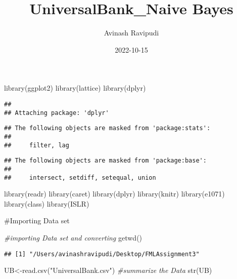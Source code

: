 \documentclass[
]{article}
\title{UniversalBank\_Naive Bayes}
\author{Avinash Ravipudi}
\date{2022-10-15}
\newenvironment{Shaded}{\begin{snugshade}}{\end{snugshade}}
\newcommand{\CommentTok}[1]{\textcolor[rgb]{0.56,0.35,0.01}{\textit{#1}}}
\newcommand{\FunctionTok}[1]{\textcolor[rgb]{0.00,0.00,0.00}{#1}}
\newcommand{\NormalTok}[1]{#1}
\newcommand{\OtherTok}[1]{\textcolor[rgb]{0.56,0.35,0.01}{#1}}
\newcommand{\StringTok}[1]{\textcolor[rgb]{0.31,0.60,0.02}{#1}}
\begin{document}
\maketitle

\begin{Shaded}
\begin{Highlighting}[]
\FunctionTok{library}\NormalTok{(ggplot2)}
\FunctionTok{library}\NormalTok{(lattice)}
\FunctionTok{library}\NormalTok{(dplyr)}
\end{Highlighting}
\end{Shaded}

\begin{verbatim}
## 
## Attaching package: 'dplyr'
\end{verbatim}

\begin{verbatim}
## The following objects are masked from 'package:stats':
## 
##     filter, lag
\end{verbatim}

\begin{verbatim}
## The following objects are masked from 'package:base':
## 
##     intersect, setdiff, setequal, union
\end{verbatim}

\begin{Shaded}
\begin{Highlighting}[]
\FunctionTok{library}\NormalTok{(readr)}
\FunctionTok{library}\NormalTok{(caret)}
\FunctionTok{library}\NormalTok{(dplyr)}
\FunctionTok{library}\NormalTok{(knitr)}
\FunctionTok{library}\NormalTok{(e1071)}
\FunctionTok{library}\NormalTok{(class)}
\FunctionTok{library}\NormalTok{(ISLR)}
\end{Highlighting}
\end{Shaded}

\#Importing Data set

\begin{Shaded}
\begin{Highlighting}[]
\CommentTok{\#importing Data set and converting }
\FunctionTok{getwd}\NormalTok{()}
\end{Highlighting}
\end{Shaded}

\begin{verbatim}
## [1] "/Users/avinashravipudi/Desktop/FMLAssignment3"
\end{verbatim}

\begin{Shaded}
\begin{Highlighting}[]
\NormalTok{UB}\OtherTok{\textless{}{-}}\FunctionTok{read.csv}\NormalTok{(}\StringTok{"UniversalBank.csv"}\NormalTok{)}
\CommentTok{\#summarize the Data}
\FunctionTok{str}\NormalTok{(UB)}
\end{Highlighting}
\end{Shaded}
\end{document}

